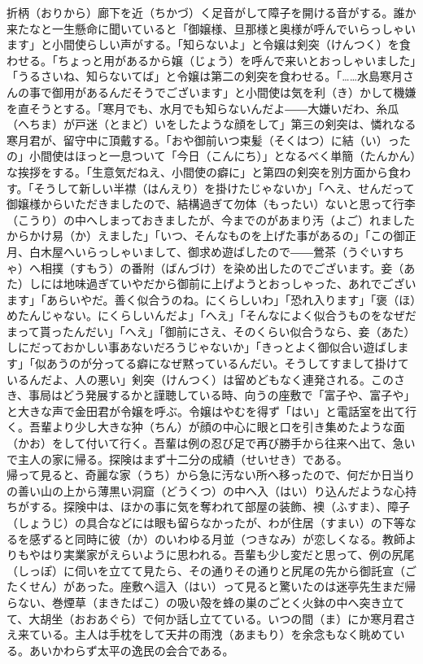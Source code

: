 \documentclass{book}
\begin{document}
折柄（おりから）廊下を近（ちかづ）く足音がして障子を開ける音がする。誰か来たなと一生懸命に聞いていると「御嬢様、旦那様と奥様が呼んでいらっしゃいます」と小間使らしい声がする。「知らないよ」と令嬢は剣突（けんつく）を食わせる。「ちょっと用があるから嬢（じょう）を呼んで来いとおっしゃいました」「うるさいね、知らないてば」と令嬢は第二の剣突を食わせる。「\ldots{}\ldots{}水島寒月さんの事で御用があるんだそうでございます」と小間使は気を利（き）かして機嫌を直そうとする。「寒月でも、水月でも知らないんだよ――大嫌いだわ、糸瓜（へちま）が戸迷（とまど）いをしたような顔をして」第三の剣突は、憐れなる寒月君が、留守中に頂戴する。「おや御前いつ束髪（そくはつ）に結（い）ったの」小間使はほっと一息ついて「今日（こんにち）」となるべく単簡（たんかん）な挨拶をする。「生意気だねえ、小間使の癖に」と第四の剣突を別方面から食わす。「そうして新しい半襟（はんえり）を掛けたじゃないか」「へえ、せんだって御嬢様からいただきましたので、結構過ぎて勿体（もったい）ないと思って行李（こうり）の中へしまっておきましたが、今までのがあまり汚（よご）れましたからかけ易（か）えました」「いつ、そんなものを上げた事があるの」「この御正月、白木屋へいらっしゃいまして、御求め遊ばしたので――鶯茶（うぐいすちゃ）へ相撲（すもう）の番附（ばんづけ）を染め出したのでございます。妾（あた）しには地味過ぎていやだから御前に上げようとおっしゃった、あれでございます」「あらいやだ。善く似合うのね。にくらしいわ」「恐れ入ります」「褒（ほ）めたんじゃない。にくらしいんだよ」「へえ」「そんなによく似合うものをなぜだまって貰ったんだい」「へえ」「御前にさえ、そのくらい似合うなら、妾（あた）しにだっておかしい事あないだろうじゃないか」「きっとよく御似合い遊ばします」「似あうのが分ってる癖になぜ黙っているんだい。そうしてすまして掛けているんだよ、人の悪い」剣突（けんつく）は留めどもなく連発される。このさき、事局はどう発展するかと謹聴している時、向うの座敷で「富子や、富子や」と大きな声で金田君が令嬢を呼ぶ。令嬢はやむを得ず「はい」と電話室を出て行く。吾輩より少し大きな狆（ちん）が顔の中心に眼と口を引き集めたような面（かお）をして付いて行く。吾輩は例の忍び足で再び勝手から往来へ出て、急いで主人の家に帰る。探険はまず十二分の成績（せいせき）である。\\
帰って見ると、奇麗な家（うち）から急に汚ない所へ移ったので、何だか日当りの善い山の上から薄黒い洞窟（どうくつ）の中へ入（はい）り込んだような心持ちがする。探険中は、ほかの事に気を奪われて部屋の装飾、襖（ふすま）、障子（しょうじ）の具合などには眼も留らなかったが、わが住居（すまい）の下等なるを感ずると同時に彼（か）のいわゆる月並（つきなみ）が恋しくなる。教師よりもやはり実業家がえらいように思われる。吾輩も少し変だと思って、例の尻尾（しっぽ）に伺いを立てて見たら、その通りその通りと尻尾の先から御託宣（ごたくせん）があった。座敷へ這入（はい）って見ると驚いたのは迷亭先生まだ帰らない、巻煙草（まきたばこ）の吸い殻を蜂の巣のごとく火鉢の中へ突き立てて、大胡坐（おおあぐら）で何か話し立てている。いつの間（ま）にか寒月君さえ来ている。主人は手枕をして天井の雨洩（あまもり）を余念もなく眺めている。あいかわらず太平の逸民の会合である。\\
\end{document}
